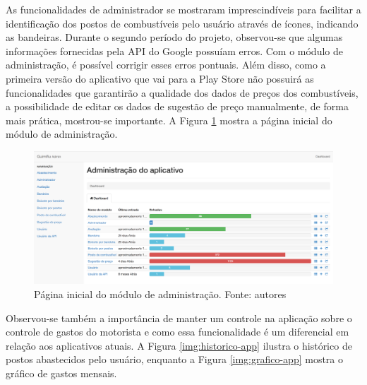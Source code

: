 As funcionalidades de administrador se mostraram imprescindíveis para facilitar a identificação dos postos de combustíveis pelo usuário através de ícones, indicando as bandeiras. Durante o segundo período do projeto, observou-se que algumas informações fornecidas pela API do Google possuíam erros. Com o módulo de administração, é possível corrigir esses erros pontuais. Além disso, como a primeira versão do aplicativo que vai para a Play Store não possuirá as funcionalidades que garantirão a qualidade dos dados de preços dos combustíveis, a possibilidade de editar os dados de sugestão de preço manualmente, de forma mais prática, mostrou-se importante. A Figura \ref{img:admin-1} mostra a página inicial do módulo de administração.

\begin{figure}[H]
    \centering
    \includegraphics[scale=0.32]{figuras/admin-1.png}
    \caption[Página inicial do módulo de administração]{Página inicial do módulo de administração. Fonte: autores}
    \label{img:admin-1}
\end{figure}

Observou-se também a importância de manter um controle na aplicação sobre o controle de gastos do motorista e como essa funcionalidade é um diferencial em relação aos aplicativos atuais. A Figura \ref{img:historico-app} ilustra o histórico de postos abastecidos pelo usuário, enquanto a Figura \ref{img:grafico-app} mostra o gráfico de gastos mensais.

